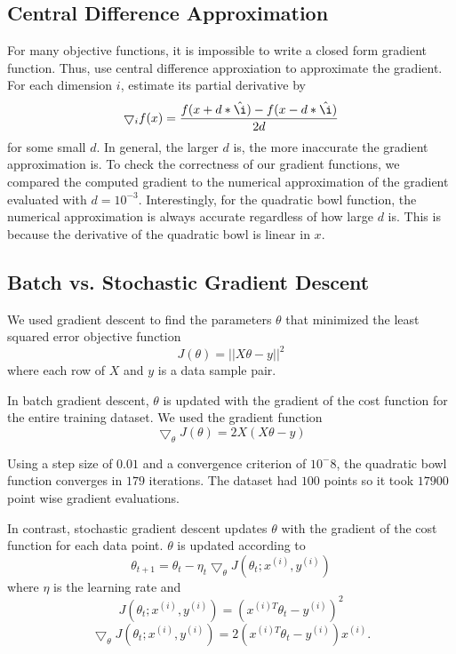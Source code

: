 \documentclass[a4paper,twoside]{article}
\begin{document}
\subsection{Central Difference Approximation}

For many objective functions, it is impossible to write a closed form gradient function. Thus, use central difference approxiation to approximate the gradient. For each dimension $i$, estimate its partial derivative by 
\begin{equation}
\bigtriangledown_i f(x) = \frac{f(x+d*\hat{\i}) - f(x-d*\hat{\i})}{2d}
\end{equation}
for some small $d$. In general, the larger $d$ is, the more inaccurate the gradient approximation is. To check the correctness of our gradient functions, we compared the computed gradient to the numerical approximation of the gradient evaluated with $d=10^{-3}$. Interestingly, for the quadratic bowl function, the numerical approximation is always accurate regardless of how large $d$ is. This is because the derivative of the quadratic bowl is linear in $x$.

\subsection{Batch vs. Stochastic Gradient Descent}
We used gradient descent to find the parameters $\theta$ that minimized the least squared error objective function
\begin{equation}
J(\theta) = ||X\theta - y||^2
\end{equation}
where each row of $X$ and $y$ is a data sample pair. 

In batch gradient descent, $\theta$ is updated with the gradient of the cost function for the entire training dataset.
We used the gradient function
\begin{equation}
\bigtriangledown_\theta J(\theta) = 2X(X\theta - y)
\end{equation}

Using a step size of $0.01$ and a convergence criterion of $10^-8$, the quadratic bowl function converges in $179$ iterations. The dataset had $100$ points so it took $17900$ point wise gradient evaluations.

In contrast, stochastic gradient descent updates $\theta$ with the gradient of the cost function for each data point. $\theta$ is updated according to 
\begin{equation}
\theta_{t+1} = \theta_t - \eta_t \bigtriangledown_\theta J(\theta_t; x^{(i)}, y^{(i)})
\end{equation}
where $\eta$ is the learning rate and
\begin{equation}
J(\theta_t; x^{(i)}, y^{(i)}) = (x^{(i)T} \theta_t - y^{(i)})^2
\end{equation}
\begin{equation}
\bigtriangledown_\theta J(\theta_t; x^{(i)}, y^{(i)}) = 2(x^{(i)T} \theta_t - y^{(i)}) x^{(i)}.
\end{equation}
\end{document}

